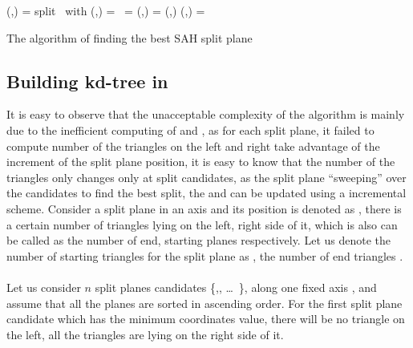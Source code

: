\begin{algorithm}[H]
{{            \ForAll {\mysplitplane\ \(\in\) \mysplitplanescan} {
                (\myleftchildbox,\myrightchildbox) = split \myvoxel\ with \mysplitplane\;
                (\mylefttrilist,\myrighttrilist) = \ClassifyTriangles{\mytriangles,\myleftchildbox,\myrightchildbox,\mysplitplane}\;  
                \mycostp\ = \SAH{\mysplitplane,\myvoxel,\mynumtrilist{\mylefttrilist},\mynumtrilist{\myrighttrilist}}\;
                \If {\mycostp\ \(<\) \mycostmin} {
                    (\mycostmin,\mysplitplane) = (\mycostp,\mysplitplane)\;
                }
            }
        (\mylefttrilistbest,\myrighttrilistbest) = \ClassifyTriangles{\mytrilist,\myleftchildbox,\myrightchildbox,\mysplitplane}\;
    }
    }
    \caption{The \mynaive algorithm of finding the best SAH split plane}
    \label{algo:NaiveFindSplit} 
\end{algorithm}

\subsection{ Building kd-tree in \mycomplexitynlogn }
It is easy to observe that the unacceptable complexity \complexitysqrtn of the \naive algorithm is mainly due to the inefficient computing of \mynumtrileft and \mynumtriright, as for each split plane, it failed to compute number of the triangles on the left and right take advantage of the increment of the split plane position, it is easy to know that the number of the triangles only changes only at split candidates, as the split plane ``sweeping'' over the candidates to find the best split, the \mynumtrileft and \mynumtriright can be updated using a incremental scheme. Consider a split plane \mysplitplane in an axis \mydimension and its position is denoted as \mysplitplanepos, there is a certain number of triangles lying on the left, right side of it, which is also can be called as the number of end, starting planes respectively. Let us denote the number of starting triangles for the split plane \mysplitplane as \mynumtristartp, the number of end triangles \mynumtriendp.

\paragraph{}
Let us consider \(n\) split planes candidates \{,, \ldots\ \}, along one fixed axis \mydimension, and assume that all the planes are sorted in ascending order. For the first split plane candidate  which has the minimum coordinates value, there will be no triangle on the left, all the triangles are lying on the right side of it. 

